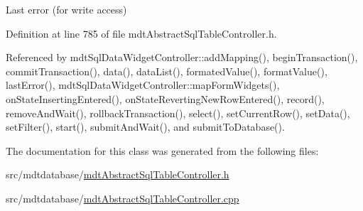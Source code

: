 Last error (for write access) 



Definition at line 785 of file mdt\-Abstract\-Sql\-Table\-Controller.\-h.



Referenced by mdt\-Sql\-Data\-Widget\-Controller\-::add\-Mapping(), begin\-Transaction(), commit\-Transaction(), data(), data\-List(), formated\-Value(), format\-Value(), last\-Error(), mdt\-Sql\-Data\-Widget\-Controller\-::map\-Form\-Widgets(), on\-State\-Inserting\-Entered(), on\-State\-Reverting\-New\-Row\-Entered(), record(), remove\-And\-Wait(), rollback\-Transaction(), select(), set\-Current\-Row(), set\-Data(), set\-Filter(), start(), submit\-And\-Wait(), and submit\-To\-Database().



The documentation for this class was generated from the following files\-:\begin{DoxyCompactItemize}
\item 
src/mdtdatabase/\hyperlink{mdt_abstract_sql_table_controller_8h}{mdt\-Abstract\-Sql\-Table\-Controller.\-h}\item 
src/mdtdatabase/\hyperlink{mdt_abstract_sql_table_controller_8cpp}{mdt\-Abstract\-Sql\-Table\-Controller.\-cpp}\end{DoxyCompactItemize}
